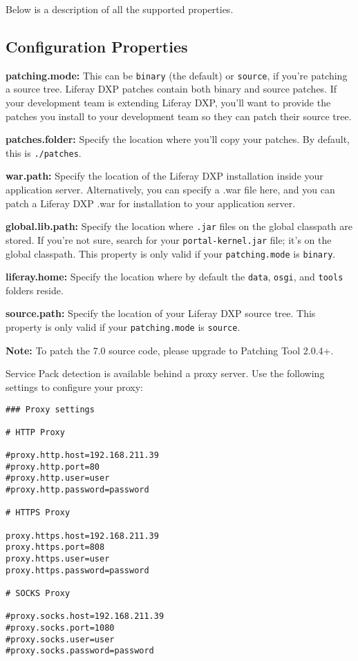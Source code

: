 Below is a description of all the supported properties.

\subsection{Configuration Properties}\label{configuration-properties}

\textbf{patching.mode:} This can be \texttt{binary} (the default) or
\texttt{source}, if you're patching a source tree. Liferay DXP patches
contain both binary and source patches. If your development team is
extending Liferay DXP, you'll want to provide the patches you install to
your development team so they can patch their source tree.

\textbf{patches.folder:} Specify the location where you'll copy your
patches. By default, this is \texttt{./patches}.

\textbf{war.path:} Specify the location of the Liferay DXP installation
inside your application server. Alternatively, you can specify a .war
file here, and you can patch a Liferay DXP .war for installation to your
application server.

\textbf{global.lib.path:} Specify the location where \texttt{.jar} files
on the global classpath are stored. If you're not sure, search for your
\texttt{portal-kernel.jar} file; it's on the global classpath. This
property is only valid if your \texttt{patching.mode} is
\texttt{binary}.

\textbf{liferay.home:} Specify the location where by default the
\texttt{data}, \texttt{osgi}, and \texttt{tools} folders reside.

\textbf{source.path:} Specify the location of your Liferay DXP source
tree. This property is only valid if your \texttt{patching.mode} is
\texttt{source}.

\noindent\hrulefill

\textbf{Note:} To patch the 7.0 source code, please upgrade to Patching
Tool 2.0.4+.

\noindent\hrulefill

Service Pack detection is available behind a proxy server. Use the
following settings to configure your proxy:

\begin{verbatim}
### Proxy settings

# HTTP Proxy

#proxy.http.host=192.168.211.39
#proxy.http.port=80
#proxy.http.user=user
#proxy.http.password=password

# HTTPS Proxy

proxy.https.host=192.168.211.39
proxy.https.port=808
proxy.https.user=user
proxy.https.password=password

# SOCKS Proxy

#proxy.socks.host=192.168.211.39
#proxy.socks.port=1080
#proxy.socks.user=user
#proxy.socks.password=password
\end{verbatim}

